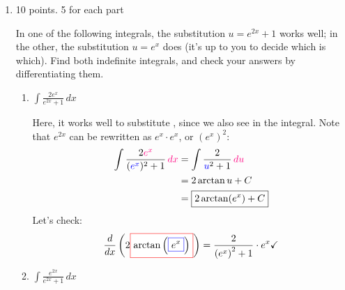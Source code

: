 \documentclass{article}
\begin{document}
\begin{enumerate}
\begin{enumerate}[topsep=0pt]
  \end{enumerate}

\item 

\begin{grading}
10 points. 5 for each part
\end{grading}

 In one of the following integrals, the substitution $u = e^{2x} + 1$
    works well; in the other, the substitution $u = e^x$ does (it's up to
    you to decide which is which).  Find both indefinite integrals, and check
    your answers by differentiating them.

      \begin{enumerate}
      \item
        \begin{problem}[\vfill]
          $\displaystyle \int \frac{2 e^{x}}{e^{2x} + 1}\,dx$
        \end{problem}

        \begin{solution} %
          Here, it works well to substitute , since we
          also see  in the integral.  Note that
          $e^{2x}$ can be rewritten as $e^x \cdot e^x$, or $(e^x)^2$: 
          \begin{align*}
            \int \frac{2 \subd{e^x}}{(\sub{e^x})^2 + 1} \, \subd{dx} &=
            \int \frac{2}{\sub{u}^2 + 1} \, \subd{du} \\ 
            &= 2 \arctan u + C \\
            &= \boxed{2 \arctan(e^x) + C}
          \end{align*}
          Let's check:
          \[ \frac{d}{dx} \left(2 \fcolorbox{red}{white}{$\displaystyle
              \arctan\left(\fcolorbox{blue}{white}{$\displaystyle e^ {
                    x} $}\right)$}\right) 
          = \frac{2}{\left(e^ { x} \right)^2+1}\cdot e^ { x} \checkmark\]
        \end{solution}

      \item
        \begin{problem}[\vfill]
          $\displaystyle \int \frac{e^{2x}}{e^{2x} + 1}\,dx$
        \end{problem}


\end{enumerate}
\end{enumerate}
\end{document}
